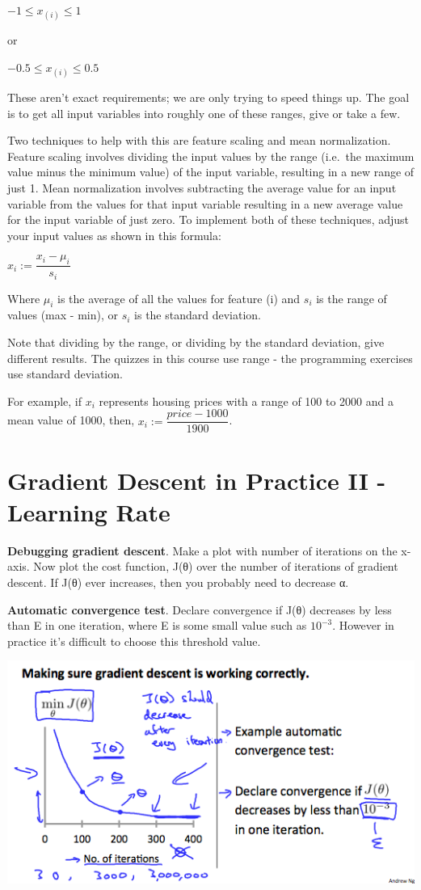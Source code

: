 \documentclass[
]{book}
\begin{document}
\(−1 ≤ x_{(i)} ≤ 1\)

or

\(−0.5 ≤ x_{(i)} ≤ 0.5\)

These aren't exact requirements; we are only trying to speed things up. The goal is to get all input variables into roughly one of these ranges, give or take a few.

Two techniques to help with this are feature scaling and mean normalization. Feature scaling involves dividing the input values by the range (i.e.~the maximum value minus the minimum value) of the input variable, resulting in a new range of just 1. Mean normalization involves subtracting the average value for an input variable from the values for that input variable resulting in a new average value for the input variable of just zero. To implement both of these techniques, adjust your input values as shown in this formula:

\(x_i := \dfrac{x_i - \mu_i}{s_i}\)

Where \(\mu_i\) is the average of all the values for feature (i) and \(s_i\) is the range of values (max - min), or \(s_i\) is the standard deviation.

Note that dividing by the range, or dividing by the standard deviation, give different results. The quizzes in this course use range - the programming exercises use standard deviation.

For example, if \(x_i\) represents housing prices with a range of 100 to 2000 and a mean value of 1000, then, \(x_i := \dfrac{price-1000}{1900}\).

\hypertarget{gradient-descent-in-practice-ii---learning-rate}{%
\section{Gradient Descent in Practice II - Learning Rate}\label{gradient-descent-in-practice-ii---learning-rate}}

\textbf{Debugging gradient descent}. Make a plot with number of iterations on the x-axis. Now plot the cost function, J(θ) over the number of iterations of gradient descent. If J(θ) ever increases, then you probably need to decrease α.

\textbf{Automatic convergence test}. Declare convergence if J(θ) decreases by less than E in one iteration, where E is some small value such as \(10^{−3}\). However in practice it's difficult to choose this threshold value.

\includegraphics{Gradient Descent in Practice II - Learning Rate graph1.png}
\end{document}
